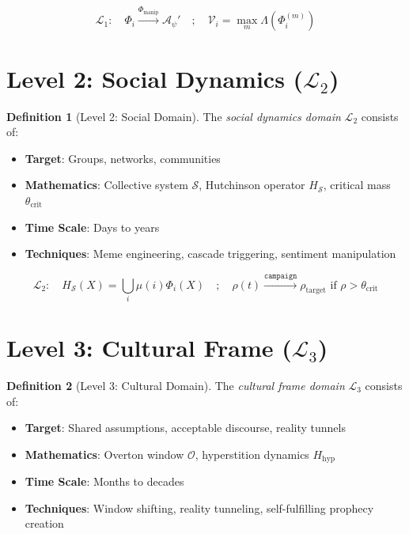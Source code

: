 \documentclass[11pt,twoside]{book}
\theoremstyle{definition}
\newtheorem{definition}{Definition}[chapter]
\theoremstyle{plain}
\theoremstyle{remark}
\newcommand{\Frac}{\Phi}
\newcommand{\PsychAttractor}{\mathcal{A}_\psi}
\newcommand{\Lacunarity}{\Lambda}
\newcommand{\ManipFrac}{\Phi_{\mathrm{manip}}}
\newcommand{\VulnScore}{\mathcal{V}}
\newcommand{\LevelI}{\mathcal{L}_1}
\newcommand{\LevelII}{\mathcal{L}_2}
\newcommand{\LevelIII}{\mathcal{L}_3}
\begin{document}
\begin{equation}
\boxed{
    \LevelI : \quad \Frac_i \xrightarrow{\ManipFrac} \PsychAttractor' \quad ; \quad
    \VulnScore_i = \max_m \Lacunarity(\Frac_i^{(m)})
}
\end{equation}

\section{Level 2: Social Dynamics ($\LevelII$)}

\begin{definition}[Level 2: Social Domain]
\label{def:level2}
The \emph{social dynamics domain} $\LevelII$ consists of:
\begin{itemize}
    \item \textbf{Target}: Groups, networks, communities
    \item \textbf{Mathematics}: Collective system $\mathcal{S}$, Hutchinson operator $H_{\mathcal{S}}$, critical mass $\theta_{\mathrm{crit}}$
    \item \textbf{Time Scale}: Days to years
    \item \textbf{Techniques}: Meme engineering, cascade triggering, sentiment manipulation
\end{itemize}
\end{definition}

\begin{equation}
\boxed{
    \LevelII : \quad H_{\mathcal{S}}(X) = \bigcup_i \mu(i) \Frac_i(X) \quad ; \quad
    \rho(t) \xrightarrow{\mathtt{campaign}} \rho_{\mathrm{target}} \text{ if } \rho > \theta_{\mathrm{crit}}
}
\end{equation}

\section{Level 3: Cultural Frame ($\LevelIII$)}

\begin{definition}[Level 3: Cultural Domain]
\label{def:level3}
The \emph{cultural frame domain} $\LevelIII$ consists of:
\begin{itemize}
    \item \textbf{Target}: Shared assumptions, acceptable discourse, reality tunnels
    \item \textbf{Mathematics}: Overton window $\mathcal{O}$, hyperstition dynamics $H_{\mathrm{hyp}}$
    \item \textbf{Time Scale}: Months to decades
    \item \textbf{Techniques}: Window shifting, reality tunneling, self-fulfilling prophecy creation
\end{itemize}
\end{definition}
\end{document}
